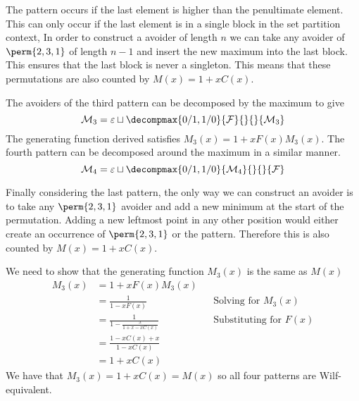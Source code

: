 The pattern  occurs if
the last element is higher than the penultimate element. This can only occur
if the last element is in a single block in the set partition context, In order
to construct a avoider of length \(n\) we can take any avoider of
\(\perm{2,3,1}\) of length \(n-1\) and insert the new maximum into the last
block.  This ensures that the last block is never a singleton. This means
that these permutations are also counted by \(M(x) = 1+xC(x)\).

The avoiders of the third pattern can be decomposed by the maximum
to give
\begin{equation*}
    \mathcal{M}_3 = \varepsilon \sqcup
    \decompmax{0/1,1/0}{\mathcal{F}}{}{}{\mathcal{M}_3}
\end{equation*}
The generating function derived satisfies \(M_3(x) = 1 + xF(x)M_3(x)\).
The fourth pattern can be decomposed around the maximum in a similar
manner.
\begin{equation*}
    \mathcal{M}_4 = \varepsilon \sqcup
    \decompmax{0/1,1/0}{\mathcal{M}_4}{}{}{\mathcal{F}}
\end{equation*}

Finally considering the last pattern, the only way we can construct an
avoider is to take any \(\perm{2,3,1}\) avoider and add a new minimum
at the start of the permutation. Adding a new leftmost point in any other
position would either create an occurrence of \(\perm{2,3,1}\) or the pattern.
Therefore this is also counted by \(M(x) = 1+xC(x)\).

We need to show that the generating function \(M_3(x)\) is the same as \(M(x)\)
\begin{equation*}
    \begin{aligned}
        M_3(x) &= 1 + xF(x)M_3(x) \\
        &= \frac{1}{1-xF(x)} && \text{Solving for \(M_3(x)\)}\\
        &= \frac{1}{1 - \frac{x}{1+x-xC(x)}} &&\text{Substituting for \(F(x)\)}\\
        &= \frac{1-xC(x) +x}{1-xC(x)}\\
        &= 1+xC(x)
    \end{aligned}
\end{equation*}
We have that \(M_3(x) = 1+xC(x)= M(x) \) so all four patterns are Wilf-equivalent.

